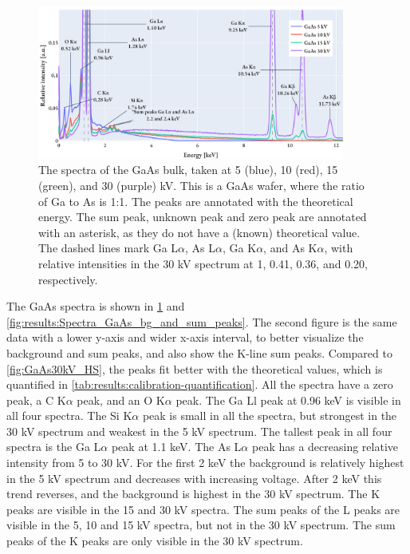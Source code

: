 \begin{figure}[b!] %
    \centering
    \includegraphics[width=0.90\textwidth]{figures/each_spectra/GaAs_everything.png}
    \caption{
        The spectra of the GaAs bulk, taken at 5 (blue), 10 (red), 15 (green), and 30 (purple) kV.
        This is a GaAs wafer, where the ratio of Ga to As is 1:1.
        The peaks are annotated with the theoretical energy.
        The sum peak, unknown peak and zero peak are annotated with an asterisk, as they do not have a (known) theoretical value.
        The dashed lines mark Ga L$\alpha$, As L$\alpha$, Ga K$\alpha$, and As K$\alpha$, with relative intensities in the 30 kV spectrum at 1, 0.41, 0.36, and 0.20, respectively.
    }
    \label{fig:results:Spectra_GaAs}
\end{figure}

The GaAs spectra is shown in \cref{fig:results:Spectra_GaAs} and \cref{fig:results:Spectra_GaAs_bg_and_sum_peaks}.
The second figure is the same data with a lower y-axis and wider x-axis interval, to better visualize the background and sum peaks, and also show the K-line sum peaks.
Compared to \cref{fig:GaAs30kV_HS}, the peaks fit better with the theoretical values, which is quantified in \cref{tab:results:calibration-quantification}. %
All the spectra have a zero peak, a C K$\alpha$ peak, and an O K$\alpha$ peak.
The Ga Ll peak at 0.96 keV is visible in all four spectra.
The Si K$\alpha$ peak is small in all the spectra, but strongest in the 30 kV spectrum and weakest in the 5 kV spectrum.
The tallest peak in all four spectra is the Ga L$\alpha$ peak at 1.1 keV.
The As L$\alpha$ peak has a decreasing relative intensity from 5 to 30 kV.
For the first 2 keV the background is relatively highest in the 5 kV spectrum and decreases with increasing voltage.
After 2 keV this trend reverses, and the background is highest in the 30 kV spectrum. %
The K peaks are visible in the 15 and 30 kV spectra.
The sum peaks of the L peaks are visible in the 5, 10 and 15 kV spectra, but not in the 30 kV spectrum.
The sum peaks of the K peaks are only visible in the 30 kV spectrum. %





